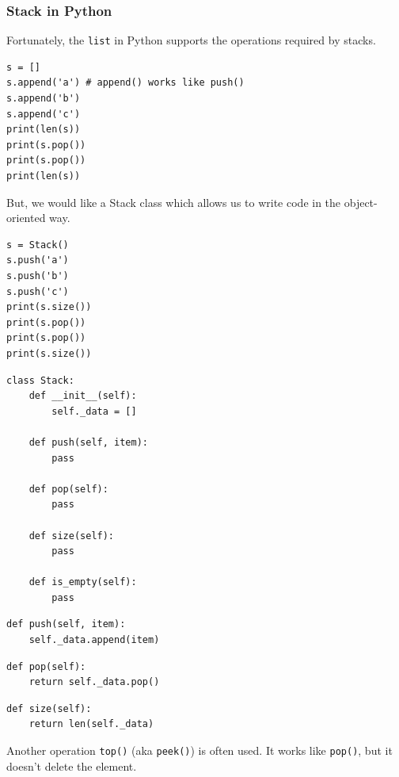 \documentclass[aspectratio=169, 14pt]{beamer}
\begin{document}
\begin{frame}[fragile]
    \frametitle{Stack in Python}
    Fortunately, the \texttt{list} in Python supports the operations required by stacks.
\begin{verbatim}
s = []
s.append('a') # append() works like push()
s.append('b')
s.append('c')
print(len(s))
print(s.pop())
print(s.pop())
print(len(s))
\end{verbatim}     

\end{frame}

\begin{frame}[fragile]
But, we would like a \alert{Stack} class which allows us to write code in the object-oriented way. 
\begin{verbatim}
s = Stack()
s.push('a')
s.push('b')
s.push('c')
print(s.size())
print(s.pop())
print(s.pop())
print(s.size())
\end{verbatim}      

\end{frame}

\begin{frame}[fragile]

\begin{verbatim}
class Stack:
    def __init__(self):
        self._data = []

    def push(self, item):
        pass

    def pop(self):
        pass

    def size(self):
        pass

    def is_empty(self):
        pass
\end{verbatim}     

\end{frame}

\begin{frame}[fragile]
    \begin{verbatim}
def push(self, item):
    self._data.append(item)    
\end{verbatim}

\begin{verbatim}
def pop(self):
    return self._data.pop()   
\end{verbatim}

    \begin{verbatim}
def size(self):
    return len(self._data)    
    \end{verbatim}
\pause
Another operation \texttt{top()} (aka \texttt{peek()}) is often used. It works like \texttt{pop()}, but it doesn't delete the element.
\end{frame}
\end{document}
